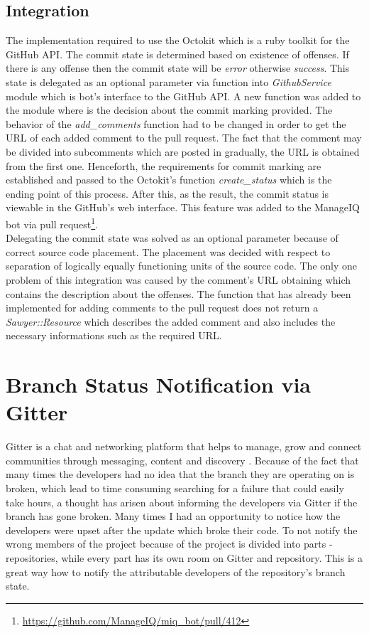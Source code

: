 \subsection{Integration}

The implementation required to use the Octokit \cite{OCTOKIT} which is a ruby toolkit for the GitHub API. The commit state is determined based on existence of offenses. If there is any offense then the commit state will be \textit{error} otherwise \textit{success}. This state is delegated as an optional parameter via function into \textit{GithubService} module which is bot's interface to the GitHub API. A new function was added to the module where is the decision about the commit marking provided. The behavior of the \textit{add\_comments} function had to be changed in order to get the URL of each added comment to the pull request. The fact that the comment may be divided into subcomments which are posted in gradually, the URL is obtained from the first one. Henceforth, the requirements for commit marking are established and passed to the Octokit's function \textit{create\_status} which is the ending point of this process. After this, as the result, the commit status is viewable in the GitHub's web interface. This feature was added to the ManageIQ bot via pull request\footnote{\url{https://github.com/ManageIQ/miq_bot/pull/412}}.\\

Delegating the commit state was solved as an optional parameter because of correct source code placement. The placement was decided with respect to separation of logically equally functioning units of the source code. The only one problem of this integration was caused by the comment's URL obtaining which contains the description about the offenses. The function that has already been implemented for adding comments to the pull request does not return a \textit{Sawyer::Resource} which describes the added comment and also includes the necessary informations such as the required URL.

\section{Branch Status Notification via Gitter}

Gitter is a chat and networking platform that helps to manage, grow and connect communities through messaging, content and discovery \cite{GITTER}. Because of the fact that many times the developers had no idea that the branch they are operating on is broken, which lead to time consuming searching for a failure that could easily take hours, a thought has arisen about informing the developers via Gitter if the branch has gone broken. Many times I had an opportunity to notice how the developers were upset after the update which broke their code. To not notify the wrong members of the project because of the project is divided into parts - repositories, while every part has its own room on Gitter and repository. This is a great way how to notify the attributable developers of the repository's branch state.

